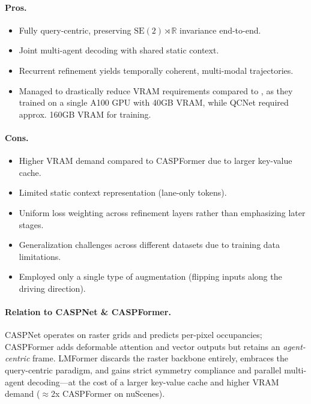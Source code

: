 \paragraph{Pros.}
\begin{itemize}[leftmargin=*, label=\greenoplus]
  \item Fully query-centric, preserving \(\mathrm{SE}(2)\!\rtimes\!\mathbb{R}\) invariance end-to-end.
  \item Joint multi-agent decoding with shared static context.
  \item Recurrent refinement yields temporally coherent, multi-modal trajectories.
  \item Managed to drastically reduce VRAM requirements compared to \cite{qcnetZhou2023}, as they trained on a single A100 GPU with 40GB VRAM, while QCNet required approx. 160GB VRAM for training.
\end{itemize}

\paragraph{Cons.}
\begin{itemize}[leftmargin=*, label=\redominus]
  \item Higher VRAM demand compared to CASPFormer due to larger key-value cache.
  \item Limited static context representation (lane-only tokens).
  \item Uniform loss weighting across refinement layers rather than emphasizing later stages.
  \item Generalization challenges across different datasets due to training data limitations.
  \item Employed only a single type of augmentation (flipping inputs along the driving direction).
\end{itemize}

\paragraph{Relation to CASPNet \& CASPFormer.}
CASPNet operates on raster grids and predicts per-pixel occupancies; CASPFormer adds deformable attention and vector outputs but retains an \emph{agent-centric} frame. LMFormer discards the raster backbone entirely, embraces the query-centric paradigm, and gains strict symmetry compliance and parallel multi-agent decoding—at the cost of a larger key-value cache and higher VRAM demand (\(\approx\)2x CASPFormer on nuScenes).

\newpage

